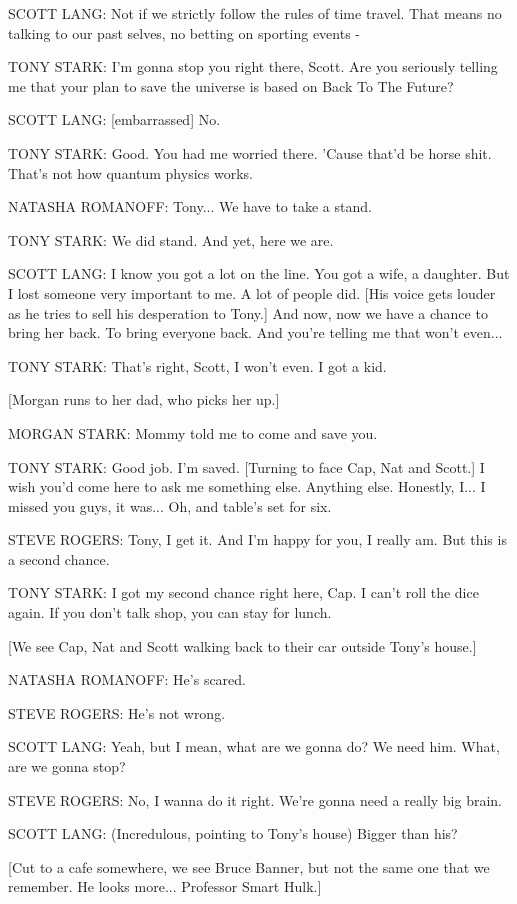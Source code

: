 SCOTT LANG: Not if we strictly follow the rules of time travel. That means no talking to our past selves, no betting on sporting events -

TONY STARK: I'm gonna stop you right there, Scott. Are you seriously telling me that your plan to save the universe is based on Back To The Future?

SCOTT LANG: [embarrassed] No.

TONY STARK: Good. You had me worried there. 'Cause that'd be horse shit. That's not how quantum physics works.

NATASHA ROMANOFF: Tony... We have to take a stand.

TONY STARK: We did stand. And yet, here we are.

SCOTT LANG: I know you got a lot on the line. You got a wife, a daughter. But I lost someone very important to me. A lot of people did. [His voice gets louder as he tries to sell his desperation to Tony.] And now, now we have a chance to bring her back. To bring everyone back. And you're telling me that won't even...

TONY STARK: That's right, Scott, I won't even. I got a kid.

[Morgan runs to her dad, who picks her up.]

MORGAN STARK: Mommy told me to come and save you.

TONY STARK: Good job. I'm saved. [Turning to face Cap, Nat and Scott.] I wish you'd come here to ask me something else. Anything else. Honestly, I... I missed you guys, it was... Oh, and table's set for six.

STEVE ROGERS: Tony, I get it. And I'm happy for you, I really am. But this is a second chance.

TONY STARK: I got my second chance right here, Cap. I can't roll the dice again. If you don't talk shop, you can stay for lunch.

[We see Cap, Nat and Scott walking back to their car outside Tony's house.]

NATASHA ROMANOFF: He's scared.

STEVE ROGERS: He's not wrong.

SCOTT LANG: Yeah, but I mean, what are we gonna do? We need him. What, are we gonna stop?

STEVE ROGERS: No, I wanna do it right. We're gonna need a really big brain.

SCOTT LANG: (Incredulous, pointing to Tony's house) Bigger than his?

[Cut to a cafe somewhere, we see Bruce Banner, but not the same one that we remember. He looks more... Professor Smart Hulk.]

